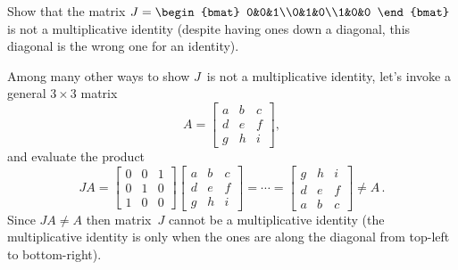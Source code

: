 \begin{reduce}
\begin{example} 
Show that the matrix \(J=\begin{bmat} 0&0&1\\0&1&0\\1&0&0 \end{bmat}\) is not a multiplicative identity (despite having ones down a diagonal, this diagonal is the wrong one for an identity).
\begin{solution} 
Among many other ways to show \(J\)~is not a multiplicative identity, let's invoke a general \(3\times3\) matrix
\begin{equation*}
A=\begin{bmatrix} a&b&c\\d&e&f\\g&h&i \end{bmatrix},
\end{equation*}
and evaluate the product
\begin{equation*}
JA=
\begin{bmatrix} 0&0&1\\0&1&0\\1&0&0 \end{bmatrix}
\begin{bmatrix} a&b&c\\d&e&f\\g&h&i \end{bmatrix}
=\cdots
=\begin{bmatrix} g&h&i\\d&e&f\\a&b&c \end{bmatrix}
\neq A\,.
\end{equation*}
Since \(JA\neq A\) then matrix~\(J\) cannot be a multiplicative identity (the multiplicative identity is only when the ones are along the diagonal from top-left to bottom-right).
\end{solution}
\end{example}
\end{reduce}




